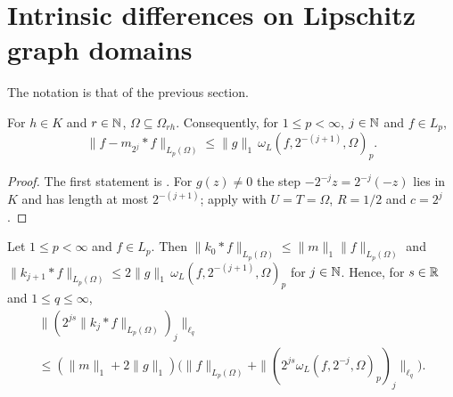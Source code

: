 \section{Intrinsic differences on Lipschitz graph domains}
\label{sec:graph-intrinsic-differences}

The notation is that of the previous section.

\begin{lemma}
\label{lem:cone-steps}
\leanok
{}
For $h \in K$ and $r \in \mathbb{N}$, $\Omega \subseteq \Omega_{rh}$. Consequently, for
$1 \leq p < \infty$, $j \in \mathbb{N}$ and $f \in L_p$,
\[
  \|f - m_{2^j} * f\|_{L_p(\Omega)} \leq \|g\|_1 \, \omega_L(f, 2^{-(j+1)}, \Omega)_p .
\]
\end{lemma}

\begin{proof}
\leanok
The first statement is . For $g(z) \neq 0$ the step
$-2^{-j} z = 2^{-j} (-z)$ lies in $K$ and has length at most $2^{-(j+1)}$; apply
 with $U = T = \Omega$, $R = 1/2$ and $c = 2^j$.
\end{proof}

\begin{lemma}
\label{lem:intrinsic-upper}
\leanok
{}
Let $1 \leq p < \infty$ and $f \in L_p$. Then
$\|k_0 * f\|_{L_p(\Omega)} \leq \|m\|_1 \|f\|_{L_p(\Omega)}$ and
$\|k_{j+1} * f\|_{L_p(\Omega)} \leq 2 \|g\|_1 \, \omega_L(f, 2^{-(j+1)}, \Omega)_p$ for
$j \in \mathbb{N}$. Hence, for $s \in \mathbb{R}$ and $1 \leq q \leq \infty$,
\begin{multline*}
  \|(2^{js} \|k_j * f\|_{L_p(\Omega)})_j\|_{\ell_q} \\
  \leq (\|m\|_1 + 2 \|g\|_1) \bigl( \|f\|_{L_p(\Omega)}
  + \|(2^{js} \omega_L(f, 2^{-j}, \Omega)_p)_j\|_{\ell_q} \bigr) .
\end{multline*}
\end{lemma}

